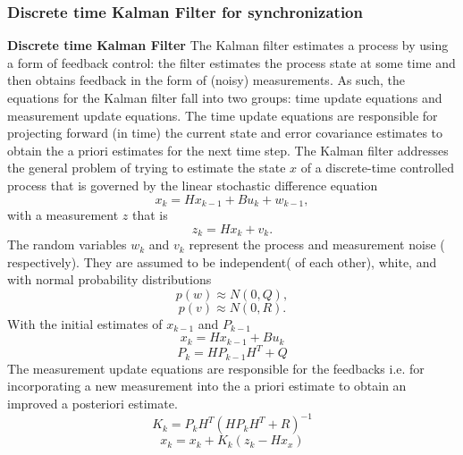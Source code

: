 \documentclass[journal]{IEEEtran}
\begin{document}
\subsubsection{\textbf{Discrete time Kalman Filter for synchronization}}
\textbf{Discrete time Kalman Filter} \newline
The Kalman filter estimates a process by using a form of feedback
control: the filter estimates the process state at some time and
then obtains feedback in the form of (noisy) measurements. As such,
the equations for the Kalman filter fall into two groups: time
update equations and measurement update equations. The time update
equations are responsible for projecting forward (in time) the
current state and error covariance estimates to obtain the a priori
estimates for the next time step.
\newline
The Kalman filter addresses the general problem of trying to
estimate the state $x$ of a discrete-time controlled process that is
governed by the linear stochastic difference equation
\begin{equation}
 x_k = Hx_{k-1} + Bu_k + w_{k-1} ,
\end{equation}
with a measurement $z$ that is
\begin{equation}
 z_k = Hx_k + v_k.
\end{equation}
The random variables $w_k$ and $v_k$ represent the process and
measurement noise ( respectively). They are assumed to be
independent( of each other), white, and with normal probability
distributions
\begin{equation}
 p(w) \approx N(0,Q),
\end{equation}
\begin{equation}
 p(v) \approx N(0,R).
\end{equation}
With the initial estimates of $x_{k-1}$ and $P_{k-1}$
\begin{equation}
x_k = Hx_{k-1} + Bu_k
\end{equation}
\begin{equation}
P_k = HP_{k-1}H^T + Q
\end{equation}
The measurement update equations are responsible for the feedbacks
i.e. for incorporating a new measurement into the a priori estimate
to obtain an improved a posteriori estimate.
\begin{equation}
K_k = P_kH^T(HP_kH^T + R)^{-1} \label{kalmangain}
\end{equation}
\begin{equation}
x_k = x_k + K_k(z_k - Hx_x)
\end{equation}
\end{document}

